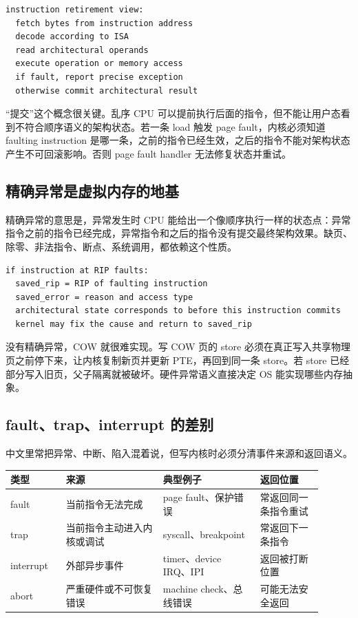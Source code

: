 \begin{lstlisting}
instruction retirement view:
  fetch bytes from instruction address
  decode according to ISA
  read architectural operands
  execute operation or memory access
  if fault, report precise exception
  otherwise commit architectural result
\end{lstlisting}

“提交”这个概念很关键。乱序 CPU 可以提前执行后面的指令，但不能让用户态看到不符合顺序语义的架构状态。若一条 load 触发 page fault，内核必须知道 faulting instruction 是哪一条，之前的指令已经生效，之后的指令不能对架构状态产生不可回滚影响。否则 page fault handler 无法修复状态并重试。

\subsection{精确异常是虚拟内存的地基}

精确异常的意思是，异常发生时 CPU 能给出一个像顺序执行一样的状态点：异常指令之前的指令已经完成，异常指令和之后的指令没有提交最终架构效果。缺页、除零、非法指令、断点、系统调用，都依赖这个性质。

\begin{lstlisting}
if instruction at RIP faults:
  saved_rip = RIP of faulting instruction
  saved_error = reason and access type
  architectural state corresponds to before this instruction commits
  kernel may fix the cause and return to saved_rip
\end{lstlisting}

没有精确异常，COW 就很难实现。写 COW 页的 store 必须在真正写入共享物理页之前停下来，让内核复制新页并更新 PTE，再回到同一条 store。若 store 已经部分写入旧页，父子隔离就被破坏。硬件异常语义直接决定 OS 能实现哪些内存抽象。

\subsection{fault、trap、interrupt 的差别}

中文里常把异常、中断、陷入混着说，但写内核时必须分清事件来源和返回语义。

\begin{longtable}{p{0.16\linewidth}p{0.28\linewidth}p{0.28\linewidth}p{0.18\linewidth}}
\toprule
类型 & 来源 & 典型例子 & 返回位置 \\
\midrule
fault & 当前指令无法完成 & page fault、保护错误 & 常返回同一条指令重试 \\
trap & 当前指令主动进入内核或调试 & syscall、breakpoint & 常返回下一条指令 \\
interrupt & 外部异步事件 & timer、device IRQ、IPI & 返回被打断位置 \\
abort & 严重硬件或不可恢复错误 & machine check、总线错误 & 可能无法安全返回 \\
\bottomrule
\end{longtable}

